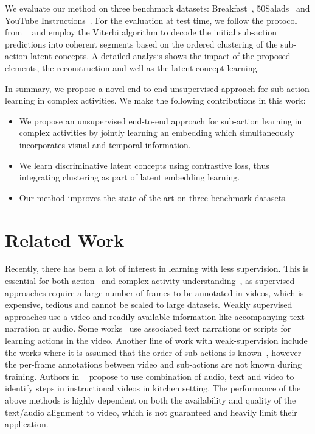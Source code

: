 \documentclass[final]{cvpr}
\begin{document}
\par We evaluate our method on three benchmark datasets: Breakfast~\cite{bf-Kuehne12}, 50Salads~\cite{50s-stein2013combining} and YouTube Instructions~\cite{Alayrac16unsupervised}.
For the evaluation at test time, we follow the protocol from ~\cite{kukleva2019unsupervised} and employ the Viterbi algorithm to decode the initial sub-action predictions into coherent segments based on the ordered clustering of the sub-action latent concepts.
A detailed analysis shows the impact of the proposed elements, the reconstruction and well as the latent concept learning. 


\par In summary, we propose a novel end-to-end unsupervised approach for sub-action learning in complex activities. We make the following contributions in this work:
\vspace{-0.15cm}
\begin{itemize}
    \item We propose an unsupervised end-to-end approach for sub-action learning in complex activities by jointly learning an embedding which simultaneously incorporates visual and temporal information.
\item We learn discriminative latent concepts using contrastive loss, thus integrating clustering as part of latent embedding learning.
\item Our method improves the state-of-the-art on three benchmark datasets.
\end{itemize}


\section{Related Work}
\par Recently, there has been a lot of interest in learning with less supervision.
This is essential for both action~\cite{rl-a-simonyan2014two, rl-a-carreira2017quo, rl-a-feichtenhofer2019slowfast} and complex activity understanding~\cite{rl-c-yeung2016end, rl-huang2016connectionist, rl-c-shou2017cdc}, as supervised approaches  require a large number of frames to be annotated in videos, which is expensive, tedious and cannot be scaled to large datasets.
Weakly supervised approaches use a video and readily available information  like accompanying text narration or audio.
Some works~\cite{rl-laptev2008learning, rl-sener2015unsupervised} use associated text narrations or scripts for learning actions in the video.
Another line of work with weak-supervision include the works where it is assumed that the  order of sub-actions is  known~\cite{tcfpn-ding2018weakly, rl-kuehne2017weakly, rl-richard2017weakly, nnvit-richard2018neuralnetwork}, however the per-frame annotations between video and sub-actions are not known during training.
Authors in ~\cite{rl-malmaud2015s} propose to use combination of audio, text and video to identify steps in instructional videos in kitchen setting. 
The performance of the above methods is highly dependent on  both the availability and quality of the text/audio alignment to video, which is not guaranteed and heavily limit their application.
\end{document}
